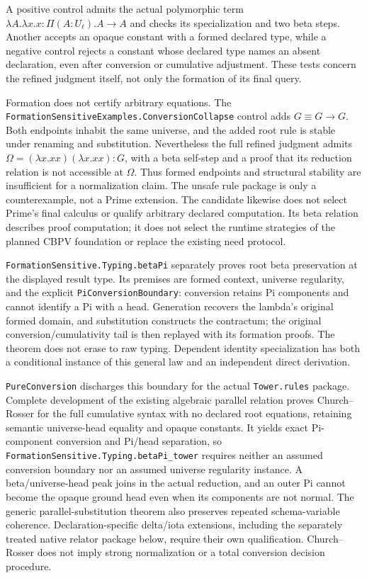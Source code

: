 \documentclass[11pt]{article}
\theoremstyle{definition}
\theoremstyle{remark}
\begin{document}
A positive control admits the actual polymorphic term
$\lambda A.\lambda x.x : \Pi(A:U_\ell).A\to A$ and checks its specialization
and two beta steps. Another accepts an opaque constant with a formed declared
type, while a negative control rejects a constant whose declared type names
an absent declaration, even after conversion or cumulative adjustment.
These tests concern the refined judgment itself, not only the formation of
its final query.

Formation does not certify arbitrary equations. The
\nolinkurl{FormationSensitiveExamples.ConversionCollapse} control adds
$G\equiv G\to G$. Both endpoints inhabit the same universe, and the added
root rule is stable under renaming and substitution. Nevertheless the full
refined judgment admits
$\Omega=(\lambda x.xx)(\lambda x.xx):G$, with a beta self-step and a proof
that its reduction relation is not accessible at $\Omega$. Thus formed
endpoints and structural stability are insufficient for a normalization
claim. The unsafe rule package is only a counterexample, not a Prime
extension. The candidate likewise does not select Prime's final calculus or
qualify arbitrary declared computation. Its beta relation describes
proof computation; it does not select the runtime strategies of the planned
CBPV foundation or replace the existing need protocol.

\nolinkurl{FormationSensitive.Typing.betaPi} separately proves root beta
preservation at the displayed result type. Its premises are formed context,
universe regularity, and the explicit \nolinkurl{PiConversionBoundary}:
conversion retains Pi components and cannot identify a Pi with a head.
Generation recovers the lambda's original formed domain, and substitution
constructs the contractum; the original conversion/cumulativity tail is
then replayed with its formation proofs. The theorem does not erase to raw
typing. Dependent identity specialization has both a conditional instance
of this general law and an independent direct derivation.

\nolinkurl{PureConversion} discharges this boundary for the actual
\nolinkurl{Tower.rules} package. Complete development of the existing
algebraic parallel relation proves Church--Rosser for the full cumulative
syntax with no declared root equations, retaining semantic universe-head
equality and opaque constants. It yields exact Pi-component conversion and
Pi/head separation, so \nolinkurl{FormationSensitive.Typing.betaPi_tower}
requires neither an assumed conversion boundary nor an assumed universe
regularity instance. A beta/universe-head peak joins in the actual reduction,
and an outer Pi cannot become the opaque ground head even when its components
are not normal. The generic parallel-substitution theorem also preserves
repeated schema-variable coherence. Declaration-specific delta/iota extensions,
including the separately treated native relator package below, require their
own qualification. Church--Rosser does not imply strong normalization or a total
conversion decision procedure.
\end{document}
